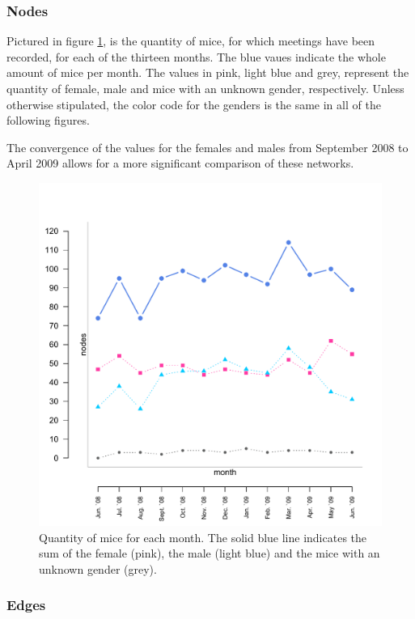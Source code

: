\subsubsection*{Nodes}

Pictured in figure \ref{fig:long_node}, is the quantity of mice, for which meetings have been recorded, for each of the thirteen months. The blue vaues indicate the whole amount of mice per month. The values in pink, light blue and grey, represent the quantity of female, male and mice with an unknown gender, respectively. Unless otherwise stipulated, the color code for the genders is the same in all of the following figures.

The convergence of the values for the females and males from September 2008 to April 2009 allows for a more significant comparison of these networks.


\begin{figure}[htpb]
\begin{center}
  \includegraphics[width=.6\textwidth]{assets/pdf/long_nodes.pdf}
  \caption[Quantity of mice over the months]{Quantity of mice for each month. The solid blue line indicates the sum of the female (pink), the male (light blue) and the mice with an unknown gender (grey).}
  \label{fig:long_node}
\end{center}
\end{figure}

\subsubsection*{Edges}

